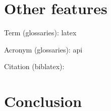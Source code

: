 \section{Other features}

Term (glossaries): \gls{latex}

Acronym (glossaries): \gls{api}

Citation (biblatex): \cite{paper_millwheel}

\section{Conclusion}

\blindtext
